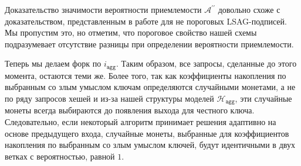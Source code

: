 \documentclass{mrl}
\theoremstyle{definition}
\numberwithin{theorem}{subsection}
\newcommand{\adversary}{\mathcal{A}}
\begin{document}
Доказательство значимости вероятности приемлемости $\adversary^{\prime \prime}$ довольно схоже с доказательством, представленным в работе \cite{liu2004linkable} для не пороговых LSAG-подписей. Мы пропустим это, но отметим, что пороговое свойство нашей схемы подразумевает отсутствие разницы при определении вероятности приемлемости.

Теперь мы делаем форк по $i_{\texttt{agg}}$. Таким образом, все запросы, сделанные до этого момента, остаются теми же. Более того, так как коэффициенты накопления по выбранным со злым умыслом ключам определяются случайными монетами, а не по ряду запросов хешей и из-за нашей структуры моделей $\mathcal{H}_{\texttt{agg}}$, эти случайные монеты всегда выбираются до появления выхода для честного ключа. Следовательно, если некоторый алгоритм принимает решения адаптивно на основе предыдущего входа, случайные монеты, выбранные для коэффициентов накопления по выбранным со злым умыслом ключей, будут идентичными в двух ветках с вероятностью, равной $1$.
\end{document}
